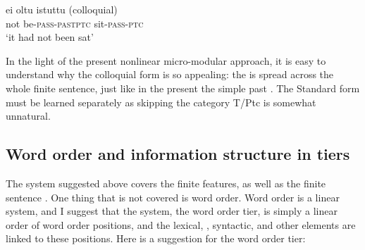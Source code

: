 \documentclass[output=paper]{langsci/langscibook}
\begin{document}
 \ex\label{ex:nikanne:24b}
\gll   ei oltu istuttu (colloquial)\\
       not be-\textsc{pass}-\textsc{past}\textsc{ptc} sit-\textsc{pass}-\textsc{ptc}\\
\glt      ‘it had not been sat’

\z
\z 

In the light of the present nonlinear micro-modular approach, it is easy to understand why the colloquial form  is so appealing: the  is spread across the whole finite sentence, just like in the present the simple past . The Standard  form must be learned separately as skipping the category T/Ptc is somewhat unnatural.

\subsection{Word order and information structure in tiers}

The system suggested above covers the finite features, as well as the finite sentence . One thing that is not covered is word order. Word order is a linear system, and I suggest that the system, the word order tier, is simply a linear order of word order positions, and the lexical, , syntactic, and other elements are linked to these positions. Here is a suggestion for the word order tier:
\end{document}
